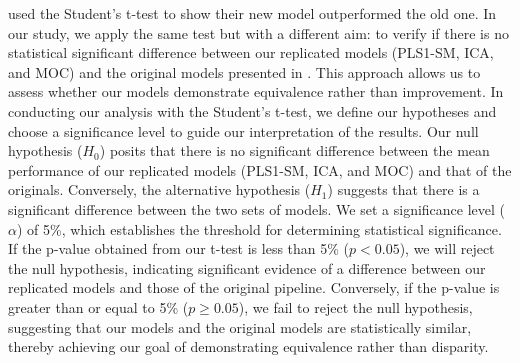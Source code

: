 \citet{andersonImprovedAccuracyQuantitative2017} used the Student's t-test to show their new model outperformed the old one. In our study, we apply the same test but with a different aim: to verify if there is no statistical significant difference between our replicated models (PLS1-SM, ICA, and MOC) and the original models presented in \citet{cleggRecalibrationMarsScience2017}. This approach allows us to assess whether our models demonstrate equivalence rather than improvement.
In conducting our analysis with the Student's t-test, we define our hypotheses and choose a significance level to guide our interpretation of the results.
Our null hypothesis (\(H_0\)) posits that there is no significant difference between the mean performance of our replicated models (PLS1-SM, ICA, and MOC) and that of the originals.
Conversely, the alternative hypothesis (\(H_1\)) suggests that there is a significant difference between the two sets of models.
We set a significance level (\(\alpha\)) of 5\%, which establishes the threshold for determining statistical significance.
If the p-value obtained from our t-test is less than 5\% (\(p < 0.05\)), we will reject the null hypothesis, indicating significant evidence of a difference between our replicated models and those of the original pipeline.
Conversely, if the p-value is greater than or equal to 5\% (\(p \geq 0.05\)), we fail to reject the null hypothesis, suggesting that our models and the original models are statistically similar, thereby achieving our goal of demonstrating equivalence rather than disparity.


